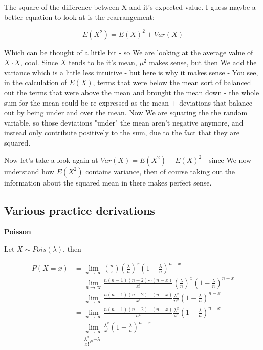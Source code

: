 \documentclass{article}
\begin{document}
		The square of the difference between X and it's expected value. I guess maybe a better equation to look at is the rearrangement:
		
		\[ E(X^2) = E(X)^2 + Var(X) \]
		
		Which can be thought of a little bit - so We are looking at the average value of $X\cdot X$, cool. Since $X$ tends to be it's mean, $\mu^2$ makes sense, but then We add the variance which is a little less intuitive - but here is why it makes sense - You see, in the calculation of $E(X)$, terms that were below the mean sort of balanced out the terms that were above the mean and brought the mean down - the whole sum for the mean could be re-expressed as the mean + deviations that balance out by being under and over the mean. Now We are squaring the the random variable, so those deviations "under" the mean aren't negative anymore, and instead only contribute positively to the sum, due to the fact that they are squared.
		
		Now let's take a look again at $Var(X) = E(X^2) - E(X)^2$ - since We now understand how $E(X^2)$ contains variance, then of course taking out the information about the squared mean in there makes perfect sense.
		
	\subsection{Various practice derivations}
		
		\textbf{Poisson}
		
			Let $X\sim Pois(\lambda)$, then
			
			\begin{align}
			P(X=x) &= \lim_{n\to\infty}  {n\choose x} \left(\frac{\lambda}{n}\right)^x\left(1 -\frac{\lambda}{n}\right)^{n-x} \\
			&= \lim_{n\to\infty} \frac{n(n-1)(n-2)\cdots (n-x)}{x!} \left(\frac{\lambda}{n}\right)^x\left(1 -\frac{\lambda}{n}\right)^{n-x} \\
			&= \lim_{n\to\infty} \frac{n(n-1)(n-2)\cdots (n-x)}{x!}\frac{\lambda^x}{n^x}\left(1 -\frac{\lambda}{n}\right)^{n-x} \\
			&= \lim_{n\to\infty} \frac{n(n-1)(n-2)\cdots (n-x)}{n^x}\frac{\lambda^x}{x!}\left(1 -\frac{\lambda}{n}\right)^{n-x} \\
			&= \lim_{n\to\infty} \frac{\lambda^x}{x!}\left(1 -\frac{\lambda}{n}\right)^{n-x} \\
			&=  \frac{\lambda^x}{x!}e^{-\lambda}
			\end{align}
		
\end{document}
